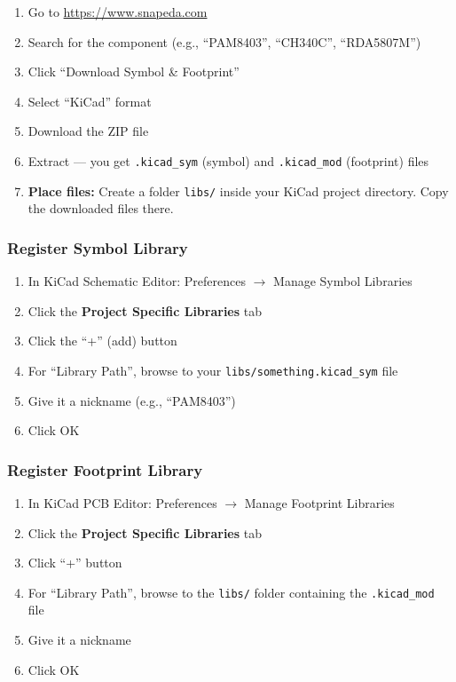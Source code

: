 \documentclass[a4paper,11pt]{article}
\renewcommand*{\,}{ }%
\begin{document}
\begin{enumerate}
    \item Go to \url{https://www.snapeda.com}
    \item Search for the component (e.g., ``PAM8403'', ``CH340C'', ``RDA5807M'')
    \item Click ``Download Symbol \& Footprint''
    \item Select ``KiCad'' format
    \item Download the ZIP file
    \item Extract --- you get \texttt{.kicad\_sym} (symbol) and \texttt{.kicad\_mod} (footprint) files
    \item \textbf{Place files:} Create a folder \texttt{libs/} inside your KiCad project directory. Copy the downloaded files there.
\end{enumerate}

\subsubsection{Register Symbol Library}
\begin{enumerate}
    \item In KiCad Schematic Editor: Preferences $\rightarrow$ Manage Symbol Libraries
    \item Click the \textbf{Project Specific Libraries} tab
    \item Click the ``+'' (add) button
    \item For ``Library Path'', browse to your \texttt{libs/something.kicad\_sym} file
    \item Give it a nickname (e.g., ``PAM8403'')
    \item Click OK
\end{enumerate}

\subsubsection{Register Footprint Library}
\begin{enumerate}
    \item In KiCad PCB Editor: Preferences $\rightarrow$ Manage Footprint Libraries
    \item Click the \textbf{Project Specific Libraries} tab
    \item Click ``+'' button
    \item For ``Library Path'', browse to the \texttt{libs/} folder containing the \texttt{.kicad\_mod} file
    \item Give it a nickname
    \item Click OK
\end{enumerate}
\end{document}
